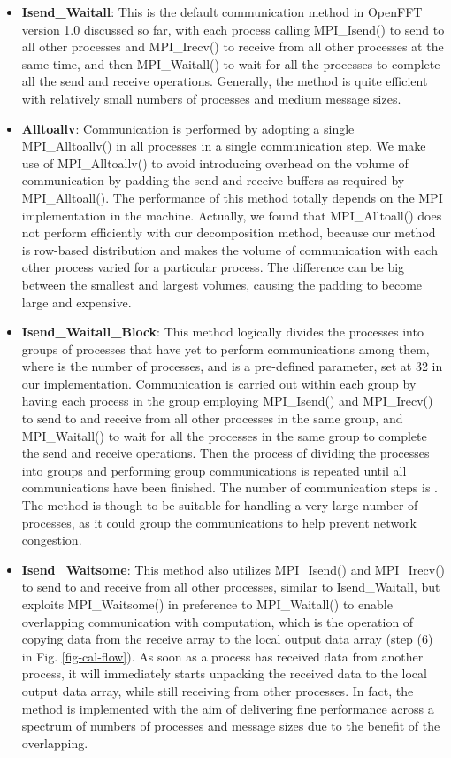 \begin{itemize}
\item
\textbf{Isend\_Waitall}: This is the default communication method in OpenFFT version 1.0 discussed so far, with each process calling MPI\_Isend() to send to all other processes and MPI\_Irecv() to receive from all other processes at the same time, and then MPI\_Waitall() to wait for all the processes to complete all the send and receive operations. Generally, the method is quite efficient with relatively small numbers of processes and medium message sizes. 
\item
\textbf{Alltoallv}: Communication is performed by adopting a single MPI\_Alltoallv() in all processes in a single communication step. We make use of MPI\_Alltoallv() to avoid introducing overhead on the volume of communication by padding the send and receive buffers as required by MPI\_Alltoall(). The performance of this method totally depends on the MPI implementation in the machine. Actually, we found that MPI\_Alltoall() does not perform efficiently with our decomposition method, because our method is row-based distribution and makes the volume of communication with each other process varied for a particular process. The difference can be big between the smallest and largest volumes, causing the padding to become large and expensive. \item
\textbf{Isend\_Waitall\_Block}: This method logically divides the processes into  groups of  processes that have yet to perform communications among them, where  is the number of processes, and  is a pre-defined parameter, set at 32 in our implementation. Communication is carried out within each group by having each process in the group employing MPI\_Isend() and MPI\_Irecv() to send to and receive from all other processes in the same group, and MPI\_Waitall() to wait for all the processes in the same group to complete the send and receive operations. Then the process of dividing the processes into groups and performing group communications is repeated until all communications have been finished. The number of communication steps is . The method is though to be suitable for handling a very large number of processes, as it could group the communications to help prevent network congestion.   
\item
\textbf{Isend\_Waitsome}: This method also utilizes MPI\_Isend() and MPI\_Irecv() to send to and receive from all other processes, similar to Isend\_Waitall, but exploits MPI\_Waitsome() in preference to MPI\_Waitall() to enable overlapping communication with computation, which is the operation of copying data from the receive array to the local output data array (step (6) in Fig. \ref{fig-cal-flow}). As soon as a process has received data from another process, it will immediately starts unpacking the received data to the local output data array, while still receiving from other processes. In fact, the method is implemented with the aim of delivering fine performance across a spectrum of numbers of processes and message sizes due to the benefit of the overlapping.  

\end{itemize}
